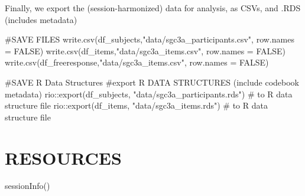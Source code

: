 \documentclass[
  letterpaper,
  DIV=11,
  numbers=noendperiod]{scrreprt}
\newenvironment{Shaded}{\begin{snugshade}}{\end{snugshade}}
\newcommand{\AttributeTok}[1]{\textcolor[rgb]{0.40,0.45,0.13}{#1}}
\newcommand{\CommentTok}[1]{\textcolor[rgb]{0.37,0.37,0.37}{#1}}
\newcommand{\ConstantTok}[1]{\textcolor[rgb]{0.56,0.35,0.01}{#1}}
\newcommand{\FunctionTok}[1]{\textcolor[rgb]{0.28,0.35,0.67}{#1}}
\newcommand{\NormalTok}[1]{\textcolor[rgb]{0.00,0.23,0.31}{#1}}
\newcommand{\SpecialCharTok}[1]{\textcolor[rgb]{0.37,0.37,0.37}{#1}}
\newcommand{\StringTok}[1]{\textcolor[rgb]{0.13,0.47,0.30}{#1}}
\begin{document}
Finally, we export the (session-harmonized) data for analysis, as CSVs,
and .RDS (includes metadata)

\begin{Shaded}
\begin{Highlighting}[]
\CommentTok{\#SAVE FILES}
\FunctionTok{write.csv}\NormalTok{(df\_subjects,}\StringTok{"data/sgc3a\_participants.csv"}\NormalTok{, }\AttributeTok{row.names =} \ConstantTok{FALSE}\NormalTok{)}
\FunctionTok{write.csv}\NormalTok{(df\_items,}\StringTok{"data/sgc3a\_items.csv"}\NormalTok{, }\AttributeTok{row.names =} \ConstantTok{FALSE}\NormalTok{)}
\FunctionTok{write.csv}\NormalTok{(df\_freeresponse,}\StringTok{"data/sgc3a\_items.csv"}\NormalTok{, }\AttributeTok{row.names =} \ConstantTok{FALSE}\NormalTok{)}

\CommentTok{\#SAVE R Data Structures }
\CommentTok{\#export R DATA STRUCTURES (include codebook metadata)}
\NormalTok{rio}\SpecialCharTok{::}\FunctionTok{export}\NormalTok{(df\_subjects, }\StringTok{"data/sgc3a\_participants.rds"}\NormalTok{) }\CommentTok{\# to R data structure file}
\NormalTok{rio}\SpecialCharTok{::}\FunctionTok{export}\NormalTok{(df\_items, }\StringTok{"data/sgc3a\_items.rds"}\NormalTok{) }\CommentTok{\# to R data structure file}
\end{Highlighting}
\end{Shaded}

\hypertarget{resources}{%
\chapter{RESOURCES}\label{resources}}

\begin{Shaded}
\begin{Highlighting}[]
\FunctionTok{sessionInfo}\NormalTok{()}
\end{Highlighting}
\end{Shaded}
\end{document}

